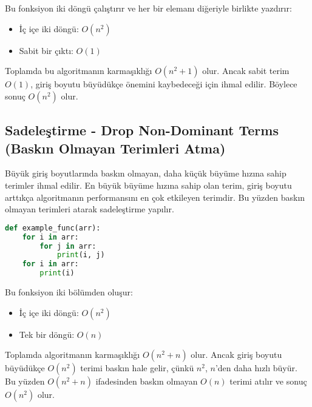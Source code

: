 Bu fonksiyon iki döngü çalıştırır ve her bir elemanı diğeriyle birlikte yazdırır:

\begin{itemize}
    \item İç içe iki döngü: $O(n^2)$
    \item Sabit bir çıktı: $O(1)$
\end{itemize}

Toplamda bu algoritmanın karmaşıklığı $O(n^2 + 1)$ olur. Ancak sabit terim $O(1)$, giriş boyutu büyüdükçe önemini kaybedeceği için ihmal edilir. Böylece sonuç $O(n^2)$ olur.

\subsection{Sadeleştirme - Drop Non-Dominant Terms (Baskın Olmayan Terimleri Atma)}

Büyük giriş boyutlarında baskın olmayan, daha küçük büyüme hızına sahip terimler ihmal edilir. En büyük büyüme hızına sahip olan terim, giriş boyutu arttıkça algoritmanın performansını en çok etkileyen terimdir. Bu yüzden baskın olmayan terimleri atarak sadeleştirme yapılır.

\begin{lstlisting}[language=Python]
def example_func(arr):
    for i in arr:
        for j in arr:
            print(i, j)
    for i in arr:
        print(i)
\end{lstlisting}

Bu fonksiyon iki bölümden oluşur:

\begin{itemize}
    \item İç içe iki döngü: $O(n^2)$
    \item Tek bir döngü: $O(n)$
\end{itemize}

Toplamda algoritmanın karmaşıklığı $O(n^2 + n)$ olur. Ancak giriş boyutu büyüdükçe $O(n^2)$ terimi baskın hale gelir, çünkü $n^2$, $n$'den daha hızlı büyür. Bu yüzden $O(n^2 + n)$ ifadesinden baskın olmayan $O(n)$ terimi atılır ve sonuç $O(n^2)$ olur.

\newpage